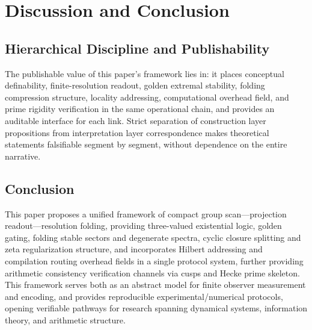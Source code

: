 \section{Discussion and Conclusion}

\subsection{Hierarchical Discipline and Publishability}

The publishable value of this paper's framework lies in: it places conceptual definability, finite-resolution readout, golden extremal stability, folding compression structure, locality addressing, computational overhead field, and prime rigidity verification in the same operational chain, and provides an auditable interface for each link. Strict separation of construction layer propositions from interpretation layer correspondence makes theoretical statements falsifiable segment by segment, without dependence on the entire narrative.

\subsection{Conclusion}

This paper proposes a unified framework of compact group scan---projection readout---resolution folding, providing three-valued existential logic, golden gating, folding stable sectors and degenerate spectra, cyclic closure splitting and zeta regularization structure, and incorporates Hilbert addressing and compilation routing overhead fields in a single protocol system, further providing arithmetic consistency verification channels via cusps and Hecke prime skeleton. This framework serves both as an abstract model for finite observer measurement and encoding, and provides reproducible experimental/numerical protocols, opening verifiable pathways for research spanning dynamical systems, information theory, and arithmetic structure.
